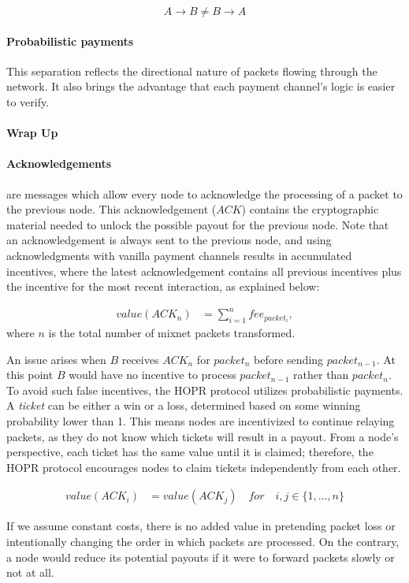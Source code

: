 $$A\rightarrow B \neq B\rightarrow A$$

\paragraph{Probabilistic payments}

This separation reflects the directional nature of packets flowing through the network. It also brings the advantage that each payment channel's logic is easier to verify.

\paragraph{Wrap Up}

\paragraph{Acknowledgements} are messages which allow every node to acknowledge the processing of a packet to the previous node. This acknowledgement ($ACK$) contains the cryptographic material needed to unlock the possible payout for the previous node. Note that an acknowledgement is always sent to the previous node, and using acknowledgments with vanilla payment channels results in accumulated incentives, where the latest acknowledgement contains all previous incentives plus the incentive for the most recent interaction, as explained below:

\begin{align}
    value (ACK_n) & =\sum_{i=1}^nfee_{packet_i},
\end{align}
where $n$ is the total number of mixnet packets transformed.

An issue arises when $B$ receives $ACK_n$ for $packet_n$ before sending $packet_{n-1}$. At this point $B$ would have no incentive to process $packet_{n-1}$ rather than $packet_{n}$. To avoid such false incentives, the HOPR protocol utilizes probabilistic payments. A \textit{ticket} can be either a win or a loss, determined based on some winning probability lower than 1. This means nodes are incentivized to continue relaying packets, as they do not know which tickets will result in a payout. From a node's perspective, each ticket has the same value until it is claimed; therefore, the HOPR protocol encourages nodes to claim tickets independently from each other.

\begin{align}
    value ( ACK_i ) & =value ( ACK_j ) \quad for \quad i,j\in \{1,\dots,n\}
\end{align}

If we assume constant costs, there is no added value in pretending packet loss or intentionally changing the order in which packets are processed. On the contrary, a node would reduce its potential payouts if it were to forward packets slowly or not at all.
